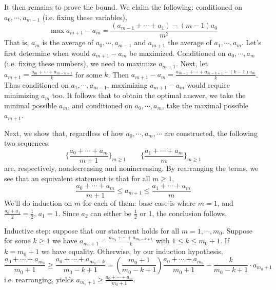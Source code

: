 \documentclass[11pt,a4paper]{article}
\begin{document}
\begin{enumerate}
    It then remains to prove the bound. 
    We claim the following: conditioned on $a_0, \cdots, a_{m-1}$ (i.e. fixing these variables), 
    \begin{equation}
    	\max a_{m+1} - a_m = \frac{(a_{m-1} + \cdots + a_1) - (m-1)a_0}{m^2}
    \end{equation}
    That is, $a_m$ is the average of $a_0, \cdots, a_{m-1}$ and $a_{m+1}$ the average of $a_1, \cdots, a_m$. 
    Let's first determine when would $a_{m+1}-a_m$ be maximized. 
    Conditioned on $a_0, \cdots, a_m$ (i.e. fixing these numbers), 
    we need to maximize $a_{m+1}$. 
    Next, let $a_{m+1} = \frac{a_m+\cdots + a_{m-k+1}}{k}$ for some $k$. 
    Then $a_{m+1}-a_m = \frac{a_{m-1} + \cdots + a_{m-k+1} - (k-1)a_m}{k}$. 
    Thus conditioned on $a_1, \cdots, a_{m-1}$, maximizing $a_{m+1}-a_m$ would require minimizing $a_m$ too. 
    It follows that to obtain the optimal answer, we take the minimal possible $a_m$, 
    and conditioned on $a_0, \cdots, a_m$, take the maximal possible $a_{m+1}$. 
    
    Next, we show that, regardless of how $a_0, \cdots, a_m, \cdots$ are constructed, 
    the following two sequences: 
    \begin{equation}
    	\{\frac{a_0+\cdots + a_m}{m + 1}\}_{m\ge 1}
    	\qquad 
    	\{\frac{a_1+\cdots + a_m}{m}\}_{m\ge 1}
    \end{equation}
    are, respectively, nondecreasing and nonincreasing. 
    By rearranging the terms, we see that an equivalent statement is that for all $m\ge 1$, 
    \begin{equation}
    	  \frac{a_0+\cdots + a_m}{m + 1}\le a_{m+1}\le \frac{a_1+\cdots + a_m}{m}
    \end{equation}
    We'll do induction on $m$ for each of them: 
    base case is where $m=1$, and $\frac{a_0+a_1}{2}=\frac 12$, $a_1=1$. 
    Since $a_2$ can either be $\frac 12$ or 1, the conclusion follows. 
    
    Inductive step: suppose that our statement holds for all $m=1, \cdots, m_0$. 
    Suppose for some $k\ge 1$ we have $a_{m_0+1}=\frac{a_{m_0} + \cdots + a_{m_0-k+1}}{k}$ with $1\le k\le m_0+1$. 
    If $k=m_0+1$ we have equality. Otherwise, 
    by our induction hypothesis, 
    \begin{equation}
    	\frac{a_0+\cdots + a_{m_0}}{m_0 + 1}\ge \frac{a_0+\cdots + a_{m_0-k}}{m_0 - k + 1}
    	= (\frac{m_0+1}{m_0-k+1})\frac{a_0+\cdots + a_{m_0}}{m_0 + 1}
    	-\frac{k}{m_0-k+1}\cdot a_{m_0+1}
    \end{equation}
    i.e. rearranging, yields $a_{m_0+1}\ge \frac{a_0+\cdots + a_m}{m_0 + 1}$. 
    

\end{enumerate}
\end{document}
